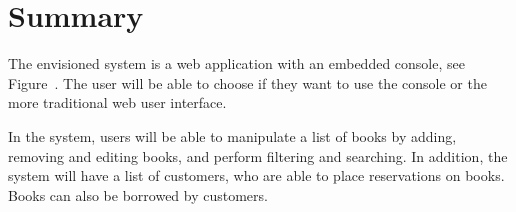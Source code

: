 \begin{comment}
  D13 & 1.5             & Order new books \\ \hline
  G1 & 3.5          & Save users' changes to server \\ \hline
  G2 & 2            & Save users' changes in real time \\ \hline
  G3 & 8            & See console and web UI simultaneously \\ \hline
  G4 & 4            & Synchronize console and web UI \\ \hline
  G5 & 3            & Tutorial \\ \hline
  G6 & 3            & Display available commands \\ \hline
  G7 & 2            & Repeat previous commands \\ \hline
  G8 & 3            & Batch commands \\ \hline
\end{tabular}
\caption{User story diffuculty}
\label{table:userstory-difficulty}
\end{table}
\end{comment}

\section{Summary}

The envisioned system is a web application with an embedded console, see Figure~. The user will be able to choose if they want to use the console or the more traditional web user interface.

In the system, users will be able to manipulate a list of books by adding, removing and editing books, and perform filtering and searching. In addition, the system will have a list of customers, who are able to place reservations on books. Books can also be borrowed by customers.
